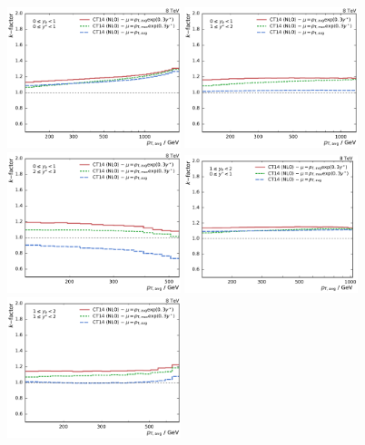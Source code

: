 \begin{figure}[htp]
    \centering
    \includegraphics[width=0.45\textwidth]{figures/theory/kfactor_comp_yb0ys0.pdf}\hfill
    \includegraphics[width=0.45\textwidth]{figures/theory/kfactor_comp_yb0ys1.pdf}
    \includegraphics[width=0.45\textwidth]{figures/theory/kfactor_comp_yb0ys2.pdf}\hfill
    \includegraphics[width=0.45\textwidth]{figures/theory/kfactor_comp_yb1ys0.pdf}
    \includegraphics[width=0.45\textwidth]{figures/theory/kfactor_comp_yb1ys1.pdf}\hfill

\end{figure}
